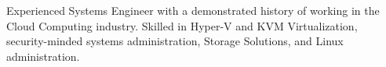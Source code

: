 
\begin{cvparagraph}

	Experienced Systems Engineer with a demonstrated history of working in the Cloud Computing industry. Skilled in Hyper-V and KVM Virtualization, security-minded systems administration, Storage Solutions, and Linux administration.
	
\end{cvparagraph}

